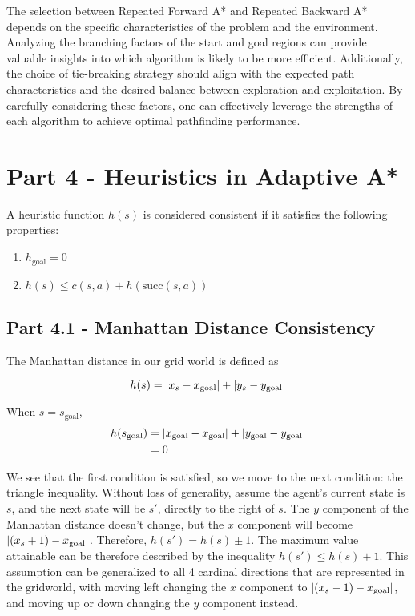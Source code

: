\documentclass[12pt]{article}
\begin{document}
The selection between Repeated Forward A* and Repeated Backward A* depends on the specific characteristics of the problem and the environment. Analyzing the branching factors of the start and goal regions can provide valuable insights into which algorithm is likely to be more efficient. Additionally, the choice of tie-breaking strategy should align with the expected path characteristics and the desired balance between exploration and exploitation. By carefully considering these factors, one can effectively leverage the strengths of each algorithm to achieve optimal pathfinding performance. 



\section{Part 4 - Heuristics in Adaptive A*}

A heuristic function 
$h(s)$ 
is considered consistent if it satisfies the following properties:

\begin{enumerate}
    \item $h_{\text{goal}} = 0$
    \item $h(s) \leq c(s, a) + h(\text{succ} (s, a))$
\end{enumerate}

\subsection{Part 4.1 - Manhattan Distance Consistency}

The Manhattan distance in our grid world is defined as

$$
h(s) = \left\lvert x_s - x_{\text{goal}} \right\rvert + \left\lvert y_s - y_{\text{goal}} \right\rvert
$$

When $s = s_\text{goal}$,
\begin{align*}
h(s_\text{goal}) &= \left\lvert x_{\text{goal}} - x_{\text{goal}} \right\rvert + \left\lvert y_{\text{goal}} - y_{\text{goal}} \right\rvert \\
&= 0\
\end{align*}

We see that the first condition is satisfied,
so we move to the next condition:
the triangle inequality.
Without loss of generality,
assume the agent's current state is $s$,
and the next state will be $s'$,
directly to the right of $s$.
The $y$ component of the Manhattan distance doesn't change,
but the $x$ component will become 
$\left\lvert(x_s + 1) - x_{\text{goal}} \right\rvert$.
Therefore,
$h(s') = h(s) \pm 1$.
The maximum value attainable can be therefore described by the inequality 
$h(s') \leq h(s) + 1$.
This assumption can be generalized to all 4 cardinal directions that are represented in the gridworld,
with moving left changing the $x$ component to $\left\lvert(x_s - 1) - x_{\text{goal}} \right\rvert$,
and moving up or down changing the $y$ component instead.
\end{document}
